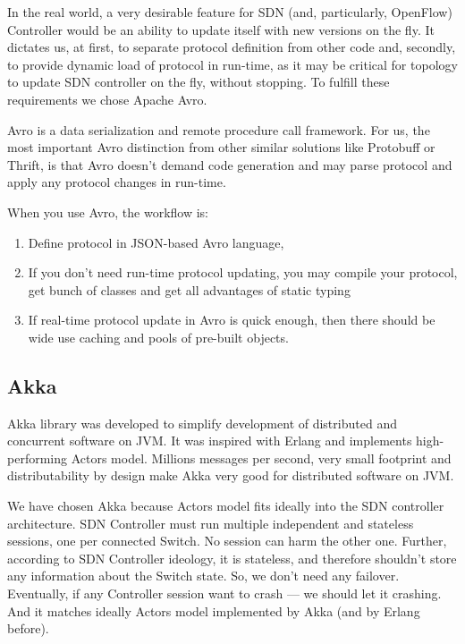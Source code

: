 \documentclass[10pt, a5paper]{article}
\begin{document}
In the real world, a very desirable feature for SDN (and, particularly, OpenFlow) Controller would be an ability to update itself with new versions on the fly. It dictates us, at first, to separate  protocol definition from other code and, secondly, to provide dynamic load of protocol in run-time, as it may be critical for topology to update SDN controller on the fly, without stopping. To fulfill these requirements we chose Apache Avro.

Avro is a data serialization and remote procedure call framework. For us, the most important Avro distinction from other similar solutions like Protobuff or Thrift, is that Avro doesn't demand code generation and may parse protocol and apply any protocol changes in run-time.

When you use Avro, the workflow is:

\begin{enumerate}
  \item Define protocol in JSON-based Avro language,
  \item If you don't need run-time protocol updating, you may compile your protocol, get bunch of classes and get all advantages of static typing
  \item If real-time protocol update in Avro is quick enough, then there should be wide use caching and pools of pre-built objects.
\end{enumerate}

\subsection*{Akka}

Akka library was developed to simplify development of distributed and concurrent software on JVM. It was inspired with Erlang and implements high-performing Actors model. Millions messages per second, very small footprint and distributability by design make Akka very good for distributed software on JVM.

We have chosen Akka because Actors model fits ideally into the SDN controller architecture. SDN Controller must run multiple independent and stateless sessions, one per connected Switch. No session can harm the other one. Further, according to SDN Controller ideology, it is stateless, and therefore shouldn't store any information about the Switch state. So, we don't need any failover. Eventually, if any Controller session want to crash --- we should let it crashing. And it matches ideally Actors model implemented by Akka (and by Erlang before).
\end{document}
